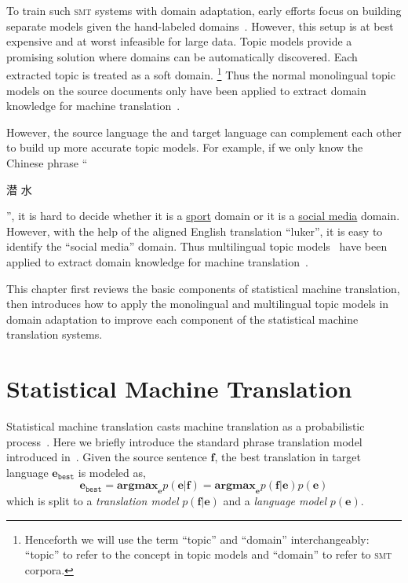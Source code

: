 To train such \textsc{smt} systems with domain adaptation, early
efforts focus on building separate models given the hand-labeled
domains~\citep{foster-07,matsoukas-09,chiang-11}. However, this setup
is at best expensive and at worst infeasible for large data.  Topic
models provide a promising solution where domains can be automatically
discovered. Each extracted topic is treated as a soft
domain. \footnote{Henceforth we will use the term ``topic'' and
  ``domain'' interchangeably: ``topic'' to refer to the concept in
  topic models and ``domain'' to refer to \textsc{smt} corpora.} Thus
the normal monolingual topic models on the source documents only have
been applied to extract domain knowledge for machine
translation~\citep{Eidelman-12}.

However, the source language the and target language can complement
each other to build up more accurate topic models. For example, if we
only know the Chinese phrase ``\begin{CJK*}{UTF8}{gbsn}潜
  水\end{CJK*}'', it is hard to decide whether it is a
  \underline{sport} domain or it is a \underline{social media}
  domain. However, with the help of the aligned English translation
  ``luker'', it is easy to identify the ``social media'' domain. Thus
  multilingual topic models~\citep{mimno-09,boyd-graber-10} have been
  applied to extract domain knowledge for machine
  translation~\citep{hu-14}.

This chapter first reviews the basic components of statistical machine
translation, then introduces how to apply the monolingual and
multilingual topic models in domain adaptation to improve each
component of the statistical machine translation systems.

\section{Statistical Machine Translation}

Statistical machine translation casts machine translation as a
probabilistic process~\citep{koehn-09}. Here we briefly introduce the
standard phrase translation model introduced
in~\citep{koehn-03}. Given the source sentence $\mathbf{f}$, the best
translation in target language $\mathbf{e}_\texttt{best}$ is modeled
as,
\begin{equation}
\mathbf{e}_\texttt{best} = \textbf{argmax}_\mathbf{e} p(\mathbf{e}|\mathbf{f}) = \textbf{argmax}_\mathbf{e} p(\mathbf{f}|\mathbf{e}) p (\mathbf{e})
\end{equation}
which is split to a \textit{translation model}
$p(\mathbf{f}|\mathbf{e})$ and a \textit{language model} $p
(\mathbf{e})$.

